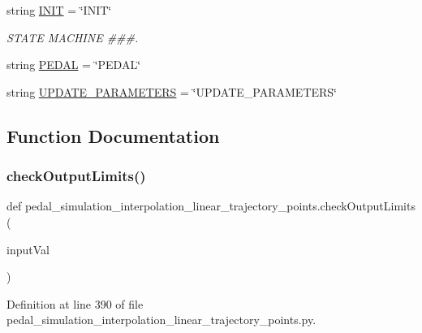 \begin{DoxyCompactItemize}
\item 
string \mbox{\hyperlink{namespacepedal__simulation__interpolation__linear__trajectory__points_ab8cabfeb707015adbd71d6bef236a23a}{I\+N\+IT}} = \char`\"{}I\+N\+IT\char`\"{}
\begin{DoxyCompactList}\small\item\em S\+T\+A\+TE M\+A\+C\+H\+I\+NE \#\#\#. \end{DoxyCompactList}\item 
string \mbox{\hyperlink{namespacepedal__simulation__interpolation__linear__trajectory__points_ad153ee88b7219453ffb7121f2bd7e29f}{P\+E\+D\+AL}} = \char`\"{}P\+E\+D\+AL\char`\"{}
\item 
string \mbox{\hyperlink{namespacepedal__simulation__interpolation__linear__trajectory__points_a2662ff45979e02a3e142a88c51b48225}{U\+P\+D\+A\+T\+E\+\_\+\+P\+A\+R\+A\+M\+E\+T\+E\+RS}} = \char`\"{}U\+P\+D\+A\+T\+E\+\_\+\+P\+A\+R\+A\+M\+E\+T\+E\+RS\char`\"{}
\end{DoxyCompactItemize}


\subsection{Function Documentation}
\mbox{\label{namespacepedal__simulation__interpolation__linear__trajectory__points_a66385fbebb1478a8f7666e94252cd986}} 
\subsubsection{\texorpdfstring{checkOutputLimits()}{checkOutputLimits()}}
{\footnotesize\ttfamily def pedal\+\_\+simulation\+\_\+interpolation\+\_\+linear\+\_\+trajectory\+\_\+points.\+check\+Output\+Limits (\begin{DoxyParamCaption}\item[{}]{input\+Val }\end{DoxyParamCaption})}



Definition at line 390 of file pedal\+\_\+simulation\+\_\+interpolation\+\_\+linear\+\_\+trajectory\+\_\+points.\+py.


